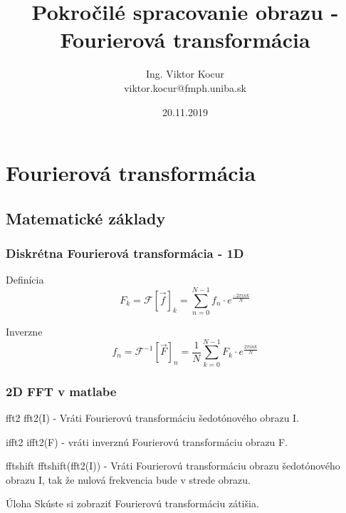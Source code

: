 \documentclass{beamer}
\title[9. cvičenie]{Pokročilé spracovanie obrazu - Fourierová transformácia}
\author[Kocur]{Ing. Viktor Kocur \\{\small viktor.kocur@fmph.uniba.sk}}
\institute{DAI FMFI UK}
\date{20.11.2019}
\begin{document}


\begin{frame}

  \titlepage

\end{frame}

\section{Fourierová transformácia}

\subsection{Matematické základy}

\begin{frame}
\frametitle{Diskrétna Fourierová transformácia - 1D} 
  \begin{block}{Definícia}    
    $$F_k = \mathscr{F}[ \vec{f}]_k = \sum_{n = 0}^{N - 1} f_n \cdot e^{\frac{-2 \pi i n k}{N}}$$
  \end{block}

  \begin{block}{Inverzne}
    $$f_n = \mathscr{F}^{-1}[\vec{F}]_n = \frac{1}{N} \sum_{k = 0}^{N - 1} F_k \cdot e^{\frac{2 \pi i n k}{N}}$$
  \end{block}

\end{frame}

\begin{frame}
\frametitle{2D FFT v matlabe} 

\begin{block}{fft2}
fft2(I) - Vráti Fourierovú transformáciu šedotónového obrazu I.
\end{block}

\begin{block}{ifft2}
ifft2(F) - vráti inverznú Fourierovú transformáciu obrazu F.
\end{block}

\begin{block}{fftshift}
fftshift(fft2(I)) - Vráti Fourierovú transformáciu obrazu šedotónového obrazu I, tak že nulová frekvencia bude v strede obrazu.
\end{block}

\begin{block}{Úloha}
Skúste si zobraziť Fourierovú transformáciu zátišia.
\end{block}

\end{frame}
\end{document}
